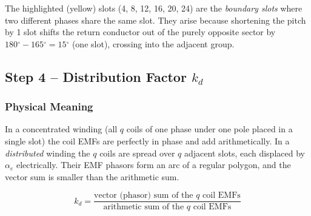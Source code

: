 \documentclass[12pt,a4paper]{article}
\newcommand{\degree}{\ensuremath{^{\circ}}}
\begin{document}
\begin{center}
\end{center}

\noindent The highlighted (yellow) slots (4, 8, 12, 16, 20, 24) are the \emph{boundary slots}
where two different phases share the same slot.
They arise because shortening the pitch by 1 slot shifts the return conductor
out of the purely opposite sector by $180\degree - 165\degree = 15\degree$
(one slot), crossing into the adjacent group.



\subsection{Step 4 -- Distribution Factor $k_d$}

\subsubsection{Physical Meaning}

In a concentrated winding (all $q$ coils of one phase under one pole placed
in a single slot) the coil EMFs are perfectly in phase and add arithmetically.
In a \emph{distributed} winding the $q$ coils are spread over $q$ adjacent
slots, each displaced by $\alpha_e$ electrically.
Their EMF phasors form an arc of a regular polygon, and the vector sum is
smaller than the arithmetic sum.

\begin{equation}
  k_d = \frac{\text{vector (phasor) sum of the }q\text{ coil EMFs}}
             {\text{arithmetic sum of the }q\text{ coil EMFs}}
\end{equation}
\end{document}
